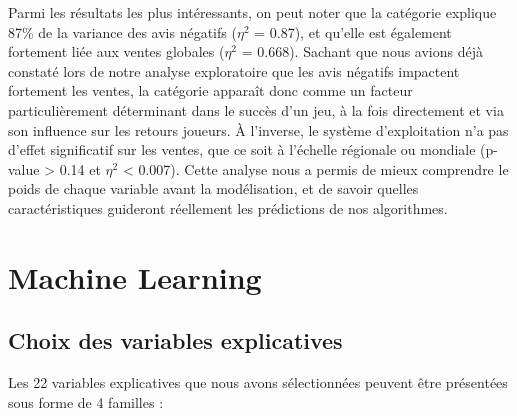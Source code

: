 \documentclass[mstat,12pt]{unswthesis}
\begin{document}
Parmi les résultats les plus intéressants, on peut noter que la catégorie explique 87\% de la variance des avis négatifs ($\eta^2$ = 0.87), et qu'elle est également fortement liée aux ventes globales ($\eta^2$ = 0.668). Sachant que nous avions déjà constaté lors de notre analyse exploratoire que les avis négatifs impactent fortement les ventes, la catégorie apparaît donc comme un facteur particulièrement déterminant dans le succès d'un jeu, à la fois directement et via son influence sur les retours joueurs. À l'inverse, le système d'exploitation n'a pas d'effet significatif sur les ventes, que ce soit à l'échelle régionale ou mondiale (p-value > 0.14 et $\eta^2$ < 0.007). Cette analyse nous a permis de mieux comprendre le poids de chaque variable avant la modélisation, et de savoir quelles caractéristiques guideront réellement les prédictions de nos algorithmes.


\hypertarget{MachineLearning}{%
\chapter{\textbf{Machine Learning}}\label{MachineLearning}}

\hypertarget{ChoixDesVariablesExplicatives}{%
\section{\textbf{Choix des variables explicatives}}\label{ChoixDesVariablesExplicatives}}


Les 22 variables explicatives que nous avons sélectionnées peuvent être présentées sous forme de 4 familles : 
\end{document}
